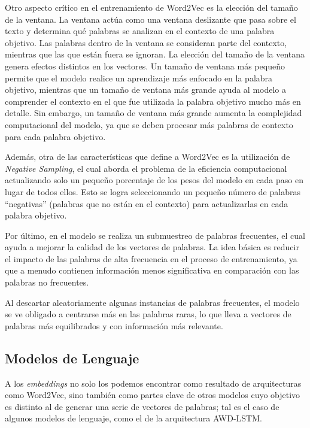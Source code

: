 Otro aspecto crítico en el entrenamiento de Word2Vec es la elección del tamaño de la ventana. La ventana actúa como una ventana deslizante que pasa sobre el texto y determina qué palabras se analizan en el contexto de una palabra objetivo. Las palabras dentro de la ventana se consideran parte del contexto, mientras que las que están fuera se ignoran. La elección del tamaño de la ventana genera efectos distintos en los vectores. Un tamaño de ventana más pequeño permite que el modelo realice un aprendizaje más enfocado en la palabra objetivo, mientras que un tamaño de ventana más grande ayuda al modelo a comprender el contexto en el que fue utilizada la palabra objetivo mucho más en detalle. \parencite{levy2014} Sin embargo, un tamaño de ventana más grande aumenta la complejidad computacional del modelo, ya que se deben procesar más palabras de contexto para cada palabra objetivo.

Además, otra de las características que define a Word2Vec es la utilización de \textit{Negative Sampling}, \parencite{mikolov2013distributedrepresentationswordsphrases} el cual aborda el problema de la eficiencia computacional actualizando solo un pequeño porcentaje de los pesos del modelo en cada paso en lugar de todos ellos. Esto se logra seleccionando un pequeño número de palabras “negativas” (palabras que no están en el contexto) para actualizarlas en cada palabra objetivo.

Por último, en el modelo se realiza un submuestreo de palabras frecuentes, el cual ayuda a mejorar la calidad de los vectores de palabras. \parencite{mikolov2013distributedrepresentationswordsphrases} La idea básica es reducir el impacto de las palabras de alta frecuencia en el proceso de entrenamiento, ya que a menudo contienen información menos significativa en comparación con las palabras no frecuentes.

Al descartar aleatoriamente algunas instancias de palabras frecuentes, el modelo se ve obligado a centrarse más en las palabras raras, lo que lleva a vectores de palabras más equilibrados y con información más relevante.

\subsection{Modelos de Lenguaje}

A los \textit{embeddings} no solo los podemos encontrar como resultado de arquitecturas como Word2Vec, sino también como partes clave de otros modelos cuyo objetivo es distinto al de generar una serie de vectores de palabras; tal es el caso de algunos modelos de lenguaje, como el de la arquitectura AWD-LSTM.


